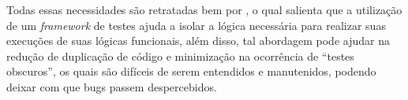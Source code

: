         Todas essas necessidades são retratadas bem por , o qual salienta que a utilização de um \textit{framework} de testes ajuda a isolar a lógica necessária para realizar suas execuções de suas lógicas funcionais, além disso, tal abordagem pode ajudar na redução de duplicação de código e minimização na ocorrência de “testes obscuros”, os quais são difíceis de serem entendidos e manutenidos, podendo deixar com que bugs passem despercebidos.
